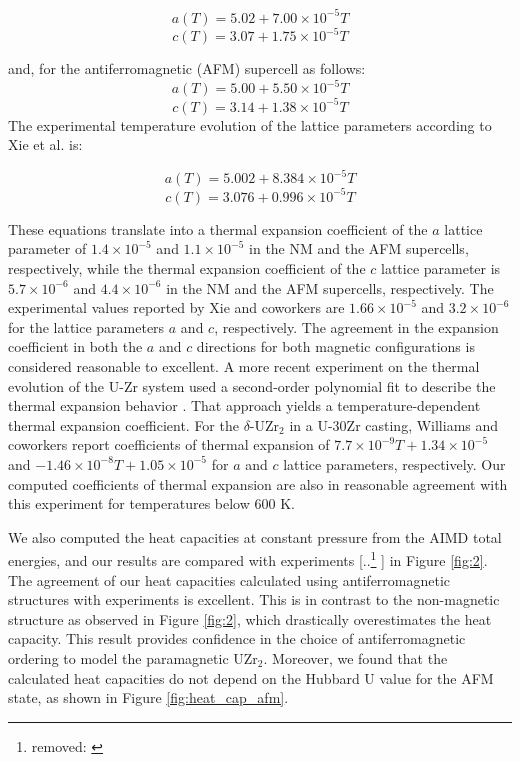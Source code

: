 \documentclass[preprint,12pt]{elsarticle}
\providecommand{\DIFadd}[1]{{\protect\color{blue} \sf #1}} %
\providecommand{\DIFdel}[1]{{\protect\color{red} [..\footnote{removed: #1} ]}} %
\providecommand{\DIFaddbegin}{} %
\providecommand{\DIFaddend}{} %
\providecommand{\DIFdelbegin}{} %
\providecommand{\DIFdelend}{} %
\newcommand{\DIFscaledelfig}{0.5}
\newlength{\DIFdelgraphicswidth} %
\newlength{\DIFdelgraphicsheight} %
\newcommand{\DIFaddincludegraphics}[2][]{{\color{blue}\fbox{\DIFOincludegraphics[#1]{#2}}}} %
\newcommand{\DIFdelincludegraphics}[2][]{%
\sbox{\DIFdelgraphicsbox}{\DIFOincludegraphics[#1]{#2}}%
\settoboxwidth{\DIFdelgraphicswidth}{\DIFdelgraphicsbox} %
\settoboxtotalheight{\DIFdelgraphicsheight}{\DIFdelgraphicsbox} %
\scalebox{\DIFscaledelfig}{%
\parbox[b]{\DIFdelgraphicswidth}{\usebox{\DIFdelgraphicsbox}\\[-\baselineskip] \rule{\DIFdelgraphicswidth}{0em}}\llap{\resizebox{\DIFdelgraphicswidth}{\DIFdelgraphicsheight}{%
\setlength{\unitlength}{\DIFdelgraphicswidth}%
\begin{picture}(1,1)%
\thicklines\linethickness{2pt} %
{\color[rgb]{1,0,0}\put(0,0){\framebox(1,1){}}}%
{\color[rgb]{1,0,0}\put(0,0){\line( 1,1){1}}}%
{\color[rgb]{1,0,0}\put(0,1){\line(1,-1){1}}}%
\end{picture}%
}\hspace*{3pt}}} %
} %
\DeclareRobustCommand{\DIFaddbegin}{\DIFOaddbegin \let\includegraphics\DIFaddincludegraphics} %
\DeclareRobustCommand{\DIFaddend}{\DIFOaddend \let\includegraphics\DIFOincludegraphics} %
\DeclareRobustCommand{\DIFdelbegin}{\DIFOdelbegin \let\includegraphics\DIFdelincludegraphics} %
\DeclareRobustCommand{\DIFdelend}{\DIFOaddend \let\includegraphics\DIFOincludegraphics} %
\begin{document}
\[
 a(T) = 5.02 + 7.00 \times 10^{-5} T \]
 \[
 c(T) = 3.07 + 1.75 \times 10^{-5} T \]

\noindent and, for the antiferromagnetic (AFM) supercell as follows:
\[
 a(T) = 5.00 + 5.50 \times 10^{-5} T \]
 \[
 c(T) = 3.14 + 1.38 \times 10^{-5} T \]
 The experimental temperature evolution of the lattice parameters according to Xie et al. \cite{xie_phase_2022} is:

 \[
 a(T) = 5.002 + 8.384 \times 10^{-5} T \]
 \[
 c(T) = 3.076 + 0.996 \times 10^{-5} T \]

These equations translate into a thermal expansion coefficient of the $a$ lattice parameter of $1.4 \times 10^{-5}$ and $1.1 \times 10^{-5}$ in the NM and the AFM supercells, respectively, while the thermal expansion coefficient of the $c$ lattice parameter is $5.7 \times 10^{-6}$ and $4.4 \times 10^{-6}$ in the NM and the AFM supercells, respectively. The experimental values reported by Xie and coworkers are $1.66 \times 10^{-5}$   and  $3.2 \times 10^{-6}$  for the lattice parameters $a$ and $c$, respectively. The agreement in the expansion coefficient in both the $a$ and $c$ directions for both magnetic configurations is considered reasonable to excellent. A more recent experiment on the thermal evolution of the U-Zr system used a second-order polynomial fit to describe the thermal expansion behavior \cite{williams_phase_2023}. That approach yields a temperature-dependent thermal expansion coefficient. For the $\delta$-UZr$_2$ in a U-30Zr casting, Williams and coworkers \cite{williams_phase_2023} report coefficients of thermal expansion of $7.7 \times 10^{-9} T + 1.34 \times 10^{-5}$ and $-1.46 \times 10^{-8} T + 1.05 \times 10^{-5}$ for $a$ and $c$  lattice parameters, respectively. Our computed coefficients of thermal expansion are also in reasonable agreement with this experiment for temperatures below 600 K. 


We also computed the heat capacities at constant pressure from the AIMD total energies, and our results are compared with experiments \DIFdelbegin \DIFdel{\cite{takahashi_heat_1989, ding_magnetic_2020} }\DIFdelend \DIFaddbegin \DIFadd{\cite{takahashi_heat_1989, ding_magnetic_2021} }\DIFaddend in Figure \ref{fig:2}. The agreement of our heat capacities calculated using antiferromagnetic structures with experiments \cite{takahashi_heat_1989} is excellent. This is in contrast to the non-magnetic structure as observed in Figure \ref{fig:2}, which drastically overestimates the heat capacity. This result provides confidence in the choice of antiferromagnetic ordering to model the paramagnetic UZr$_2$. Moreover, we found that the calculated heat capacities do not depend on the Hubbard U value for the AFM state, as shown in Figure \ref{fig:heat_cap_afm}. 
\end{document}
